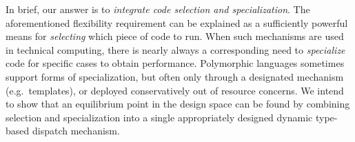 In brief, our answer is to \emph{integrate code selection and specialization}.
The aforementioned flexibility requirement can be explained as
a sufficiently powerful means for \emph{selecting} which piece of code
to run.
When such mechanisms are used in technical computing, there is nearly
always a corresponding need to \emph{specialize} code for specific cases
to obtain performance.
Polymorphic languages sometimes support forms of specialization,
but often only through a designated mechanism (e.g.\ templates), or
deployed conservatively out of resource concerns.
We intend to show that an equilibrium point in the design space can be found
by combining selection and specialization into a single appropriately designed
dynamic type-based dispatch mechanism.









